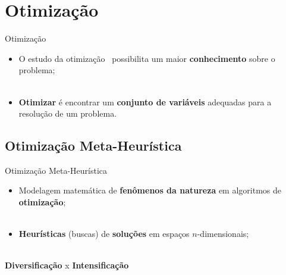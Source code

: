 \section{Otimização}
\label{s.optimization}

\begin{frame}{Otimização}
	\begin{itemize}
		\justifying
		\item O estudo da otimização~\cite{bertsekas99} possibilita um maior \textbf{conhecimento} sobre o problema;
		\\~\\
		\item \textbf{Otimizar} é encontrar um \textbf{conjunto de variáveis} adequadas para a resolução de um problema.
		\end{itemize}
\end{frame}

\subsection{Otimização Meta-Heurística}
\label{ss.optimization_mh}

\begin{frame}{Otimização Meta-Heurística}
	\begin{itemize}
		\justifying
		\item Modelagem matemática de \textbf{fenômenos da natureza} em algoritmos de \textbf{otimização};
		\\~\\
		\item \textbf{Heurísticas} (buscas) de \textbf{soluções} em espaços $n$-dimensionais;
		\\~\\
	\end{itemize}
	\vspace*{0.5cm}
	\begin{block}{}
		\centering
		\textbf{Diversificação} x \textbf{Intensificação}
	\end{block}	
\end{frame}
